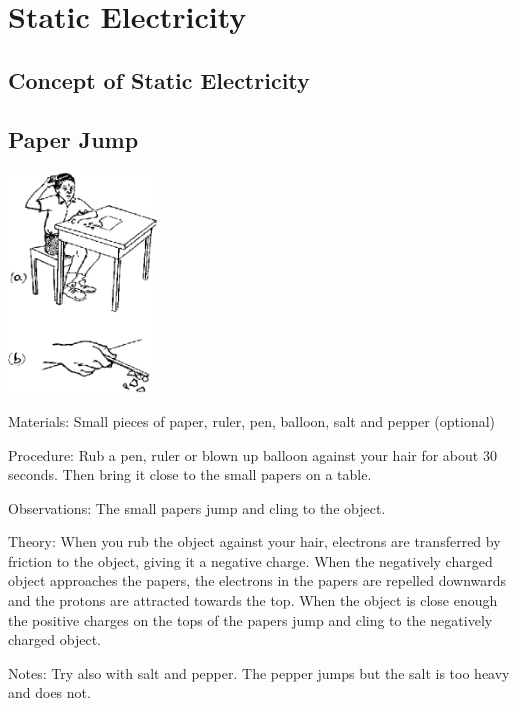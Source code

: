 \section{Static Electricity}

\begin{multicols}{2}


\section*{Concept of Static Electricity}


\subsection{Paper Jump}

\begin{center}
\includegraphics[width=0.3\textwidth]{./img/source/static-elec.png}
\end{center}

\begin{description*}
\item[Materials:]{Small pieces of paper, ruler, pen, balloon, salt and pepper (optional)}
\item[Procedure:]{Rub a pen, ruler or blown up balloon against your hair for about 30 seconds. Then bring it close to the small papers on a table.}
\item[Observations:]{The small papers jump and cling to the object.}
\item[Theory:]{When you rub the object against your hair, electrons are transferred by friction to the object, giving it a negative charge. When the negatively charged object approaches the papers, the electrons in the papers are repelled downwards and the protons are attracted towards the top. When the object is close enough the positive charges on the tops of the papers jump and cling to the negatively charged object.}
\item[Notes:]{Try also with salt and pepper. The pepper jumps but the salt is too heavy and does not.}
\end{description*}


\end{multicols}
